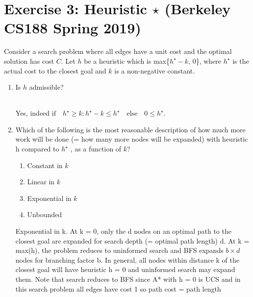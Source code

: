 \documentclass[9pt,a4paper]{extarticle}
\newenvironment{solution}
    {%
    \color{red}
    }
    { 
    \color{black}
    }
\begin{document}
\section*{Exercise 3: Heuristic $\star$ (Berkeley CS188 Spring 2019)}
Consider a search problem where all edges have a unit cost and the optimal solution has cost $C$. Let $h$ be a heuristic which is max\{$h^\star - k$, 0\}, where $h^\star$ is the actual cost to the closest goal and $k$ is a non-negative constant.
\begin{enumerate}
    \item Is $h$ admissible?
    \begin{solution}
    \\
    Yes, indeed $\text{if} \quad h^\star \geq k: h^\star - k \leq h^\star \quad \text{else} \quad 0 \leq h^\star$.
    \end{solution}
    \item Which of the following is the most reasonable description of how much more work will be done (= how many more nodes will be expanded) with heuristic h compared to $h^\star$ , as a function of $k$?
    \begin{enumerate}
        \item Constant in $k$
        \item Linear in $k$
        \item Exponential in $k$
        \item Unbounded
    \end{enumerate}
    \begin{solution}
    Exponential in k. At k = 0, only the d nodes on an optimal path to the closest goal are expanded for search depth (= optimal path length) d. At k = max(h), the problem reduces to uninformed search and BFS expands $b \times d$ nodes for branching factor b. In general, all nodes within distance k of the closest goal will have heuristic h = 0 and uninformed search may expand them. Note that search reduces to BFS since A* with h = 0 is UCS and in this search problem all edges have cost 1 so path cost = path length
    \end{solution}
\end{enumerate}
\end{document}
